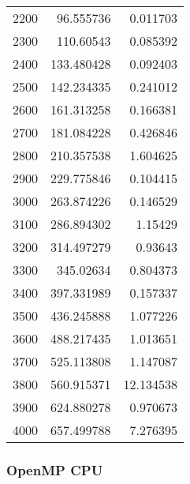 \begin{longtable}{r r r}
2200 & 96.555736 & 0.011703 \\
2300 & 110.60543 & 0.085392 \\
2400 & 133.480428 & 0.092403 \\
2500 & 142.234335 & 0.241012 \\
2600 & 161.313258 & 0.166381 \\
2700 & 181.084228 & 0.426846 \\
2800 & 210.357538 & 1.604625 \\
2900 & 229.775846 & 0.104415 \\
3000 & 263.874226 & 0.146529 \\
3100 & 286.894302 & 1.15429 \\
3200 & 314.497279 & 0.93643 \\
3300 & 345.02634 & 0.804373 \\
3400 & 397.331989 & 0.157337 \\
3500 & 436.245888 & 1.077226 \\
3600 & 488.217435 & 1.013651 \\
3700 & 525.113808 & 1.147087 \\
3800 & 560.915371 & 12.134538 \\
3900 & 624.880278 & 0.970673 \\
4000 & 657.499788 & 7.276395 \\
\end{longtable}

\subsubsection{OpenMP CPU}

